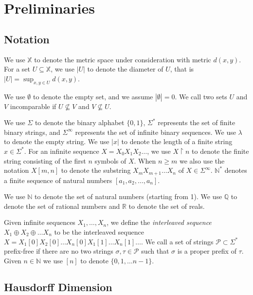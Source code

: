 \documentclass[11pt]{article}
\newcommand{\restr}{\upharpoonright}
\newcommand{\N}{\mathbb{N}}
\newcommand{\Q}{\mathbb{Q}}
\newcommand{\R}{\mathbb{R}}
\newcommand{\X}{{\mathbb{X}}}
\newcommand{\Rho}{\mathcal{P}}
\begin{document}
\section{Preliminaries} \label{sec:Prelim}
\subsection{Notation}
We use $\mathbb{X}$ to denote the metric space under consideration with metric $d(x,y)$.
For a set $ U \subseteq \X$, we use $|U|$ to denote the diameter of
$U$, that is $|U| = \sup_{x,y \in U} d(x,y)$. 

We use $\emptyset$ to denote the empty set, and we assume $|\emptyset| = 0$.  We call two sets $U$ and $V$ incomparable if $U \not\subseteq V$ and $V \not\subseteq U$.

We use $\Sigma$ to denote the binary alphabet $\{0,1\}$, $\Sigma^*$
represents the set of finite binary strings, and $\Sigma^\infty$
represents the set of infinite binary sequences. We use $\lambda$ to denote the empty string.
We use $\lvert x
\rvert$ to denote the length of a finite string $x \in \Sigma^*$. For
an infinite sequence $X =X_0X_1X_2\dots$, we use $X \restr n$
to denote the finite string consisting of the first $n$ symbols of
$X$. When $n \geq m$ we also use the notation $X[m,n]$ to denote the
substring $X_mX_{m+1}\dots X_n$ of $X \in \Sigma^\infty$. 
$\N^*$ denotes a finite sequence of natural numbers $[a_1, a_2, \dots, a_n]$. 

We use $\N$ to denote the set of natural numbers (starting from 1). 
We use $\Q$ to denote the set of rational numbers and $\R$ to denote the set of reals.



 
Given infinite sequences $X_1,  \dots, X_n$, we define the
\emph{interleaved sequence} $X_1 \oplus X_2 \oplus \dots
X_{n}$ to be the interleaved sequence $X = X_1[0]X_2[0] \dots X_n[0]X_1[1]\dots X_n[1]\dots$. 
 We call a set of strings $\Rho \subset \Sigma^*$  prefix-free if there are no two strings $\sigma,\tau \in \Rho$ such that $\sigma$ is a proper prefix of $\tau$. Given $n \in \N$ we use $[n]$ to denote $\{0,1,\dots n-1\}$. 




\subsection{Hausdorff Dimension} \label{sec:HausdorffDimension}
\end{document}
